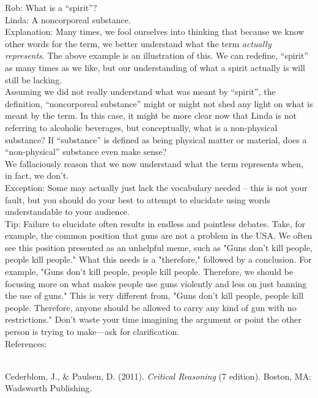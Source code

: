 \documentclass[a4paper,12pt,single,pdftex]{scrartcl}
\begin{document}
{    
      Rob: What is a “spirit”?
    \\

    
      Linda: A noncorporeal substance.
    \\

    
      Explanation: Many times, we fool ourselves into thinking that because we know other words for the term, we better understand what the term {\it actually represents}.  The above example is an illustration of this.  We can redefine, “spirit” as many times as we like, but our understanding of what a spirit actually is will still be lacking.
    \\

    
      Assuming we did not really understand what was meant by “spirit”, the definition, “noncorporeal substance” might or might not shed any light on what is meant by the term.  In this case, it might be more clear now that Linda is not referring to alcoholic beverages, but conceptually, what is a non-physical substance?  If “substance” is defined as being physical matter or material, does a “non-physical” substance even make sense?
    \\

    
      We fallaciously reason that we now understand what the term represents when, in fact, we don’t.
    \\

    
      Exception: Some may actually just lack the vocabulary needed -- this is not your fault, but you should do your best to attempt to elucidate using words understandable to your audience.
    \\

    
      Tip: Failure to elucidate often results in endless and pointless debates. Take, for example, the common position that guns are not a problem in the USA. We often see this position presented as an unhelpful meme, such as "Guns don't kill people, people kill people." What this needs is a "therefore," followed by a conclusion. For example, "Guns don't kill people, people kill people. Therefore, we should be focusing more on what makes people use guns violently and less on just banning the use of guns." This is very different from, "Guns don't kill people, people kill people. Therefore, anyone should be allowed to carry any kind of gun with no restrictions." Don't waste your time imagining the argument or point the other person is trying to make—ask for clarification.
    \\

    References:

    
      
        
      \\

      
        
          Cederblom, J., \& Paulsen, D. (2011). {\it Critical Reasoning} (7 edition). Boston, MA: Wadsworth Publishing.
        
      
    
  }
\end{document}
